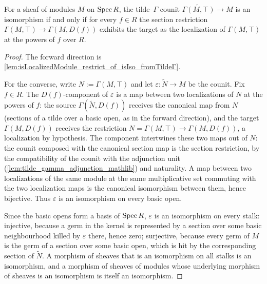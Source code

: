 \begin{lemma}
  \label{lem:isIso_fromTildeΓ_iff_isLocalizedModule_restrict}
  \leanok
  For a sheaf of modules \(M\) on \(\operatorname{Spec} R\), the tilde--\(\Gamma\) counit
  \(\widetilde{\Gamma(M, \top)} \to M\) is an isomorphism if and only if for every
  \(f \in R\) the section restriction \(\Gamma(M, \top) \to \Gamma(M, D(f))\) exhibits
  the target as the localization of \(\Gamma(M, \top)\) at the powers of \(f\) over
  \(R\).
\end{lemma}
\begin{proof}
  \leanok
  The forward direction is \cref{lem:isLocalizedModule_restrict_of_isIso_fromTildeΓ}.

  For the converse, write \(N := \Gamma(M, \top)\) and let
  \(\varepsilon : \widetilde{N} \to M\) be the counit. Fix \(f \in R\). The
  \(D(f)\)-component of \(\varepsilon\) is a map between two localizations of \(N\) at
  the powers of \(f\): the source \(\Gamma(\widetilde{N}, D(f))\) receives the canonical
  map from \(N\) (sections of a tilde over a basic open, as in the forward direction),
  and the target \(\Gamma(M, D(f))\) receives the restriction
  \(N = \Gamma(M, \top) \to \Gamma(M, D(f))\), a localization by hypothesis. The
  component intertwines these two maps out of \(N\): the counit composed with the
  canonical section map is the section restriction, by the compatibility of the counit
  with the adjunction unit (\cref{lem:tilde_gamma_adjunction_mathlib}) and naturality.
  A map between two localizations of the same module at the same multiplicative set
  commuting with the two localization maps is the canonical isomorphism between them,
  hence bijective. Thus \(\varepsilon\) is an isomorphism on every basic open.

  Since the basic opens form a basis of \(\operatorname{Spec} R\), \(\varepsilon\) is an isomorphism
  on every stalk: injective, because a germ in the kernel is represented by a section
  over some basic neighbourhood killed by \(\varepsilon\) there, hence zero; surjective,
  because every germ of \(M\) is the germ of a section over some basic open, which is
  hit by the corresponding section of \(\widetilde{N}\). A morphism of sheaves that is
  an isomorphism on all stalks is an isomorphism, and a morphism of sheaves of
  modules whose underlying morphism of sheaves is an isomorphism is itself an
  isomorphism.
\end{proof}

